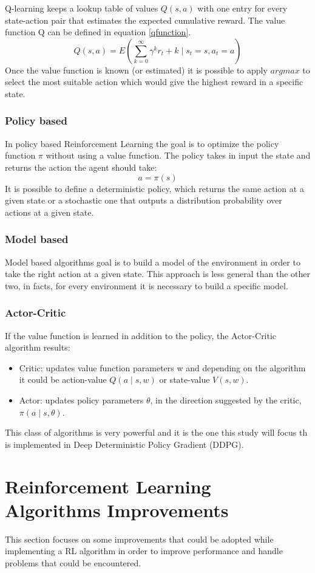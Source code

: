 \documentclass[Lau,oneside,noexaminfo]{sapthesis} %
\begin{document}
Q-learning keeps a lookup table of values $Q(s,a)$ with one entry for every state-action pair that estimates the  expected cumulative reward. The value function Q can be defined in equation \ref{qfunction}.
\begin{equation}
Q( s,a ) = E( \sum_{k=0}^{\infty} \gamma^k r_t+k \mid s_t=s, a_t=a )
\label{qfunction}
\end{equation}
Once the value function is known (or estimated) it is possible to apply $argmax$ to select the most suitable action which would give the highest reward in a specific state.
\subsection{Policy based}
In policy based Reinforcement Learning the goal is to optimize the policy function $\pi$ without using a value function. The policy takes in input the state and returns the action the agent should take:
\begin{equation}
a = \pi(s)
\end{equation}
It is possible to define a deterministic policy, which returns the same action at a given state or a stochastic one  that outputs a distribution probability over actions at a given state.
\subsection{Model based}
Model based algorithms goal is to build a model of the environment in order to take the right action at a given state. This approach is less general than the other two, in facts, for every environment it is necessary to build a specific model.
\subsection{Actor-Critic}
If the value function is learned in addition to the policy, the Actor-Critic algorithm results:
\begin{itemize}
	\item Critic: updates value function parameters w and depending on the algorithm it could be action-value $Q(a\mid s,w)$ or state-value $V(s,w)$.
	\item Actor: updates policy parameters $\theta$, in the direction suggested by the critic, $\pi(a\mid s,\theta)$.
\end{itemize}
This class of algorithms is very powerful and it is the one this study will focus th is implemented in Deep Deterministic Policy Gradient (DDPG).
\chapter{Reinforcement Learning Algorithms Improvements}
This section focuses on some improvements that could be adopted while implementing a RL algorithm in order to improve performance and handle problems that could be encountered.
\end{document}
